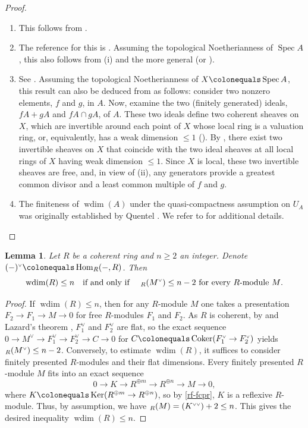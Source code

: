 \documentclass[JEP,XML,SOM,Unicode,published]{cedram}
\newenvironment{enumeratei}
{\bgroup\def\theenumi{\roman{enumi}}\def\theenumii{\arabic{enumii}}\begin{enumerate}}
{\end{enumerate}\egroup}
\newcommand{\NoChangel}[1]{%
\expandafter\let\csname old\string#1\endcsname=#1
\let#1=\relax
\newcommand{#1}{\mathop{\mathcode`l="716C\csname old\string#1\endcsname\mathcode`l="7160}\nolimits}%
}
\let\oldvee\vee
\renewcommand{\vee}{{\scriptscriptstyle\oldvee}}
\let\ce\colonequals
\let\x\text
\let\q\quad
\DeclareMathOperator{\fldim}{fl.dim}\NoChangel{\fldim}
\newcommand{\ddual}{\vee\vee}
\DeclareMathOperator{\Ker}{Ker}
\DeclareMathOperator{\Coker}{Coker}
\DeclareMathOperator{\Spec}{Spec}
\DeclareMathOperator{\wdim}{wdim}
\DeclareMathOperator{\Hom}{Hom}
\newcommand{\bpf}{\begin{proof}}
\newcommand{\epf}{\end{proof}}
\newcommand{\blem}{\begin{lemma}}
\newcommand{\elem}{\end{lemma}}
\newcommand{\benumr}{\begin{enumeratei}}
\newcommand{\eenumr}{\end{enumeratei}}
\providecommand{\SP}[1]{\cite[\href{https://stacks.math.columbia.edu/tag/#1}{#1}]{SP}}
\theoremstyle{plain}
\newtheorem{lemma}[subsection]{Lemma}
\theoremstyle{definition}
\begin{document}
\skpt
\bpf
\benumr
\item This follows from \cite[Cor.\,4.3]{Ber72}.

\item The reference for this is \cite[Prop.\,2.4]{Que71}. Assuming the topological Noetherianness of $\Spec A$, this also follows from (i) and the more general  (or ).

\item See \cite[Prop.\,3.2]{Que71}. Assuming the topological Noetherianness of $X\ce\Spec A$, this result can also be deduced from  as follows: consider two nonzero elements, $f$ and $g$, in $A$.
Now, examine the two (finitely generated) ideals, $fA+gA$ and $fA\cap gA$, of $A$. These two ideals define two coherent sheaves on $X$, which are invertible around each point of $X$ whose local ring is a valuation ring, or, equivalently, has a weak dimension $\le 1$ (\SP{092S}). By , there exist two invertible sheaves on $X$ that coincide with the two ideal sheaves at all local rings of $X$ having weak dimension $\le 1$. Since $X$ is local, these two invertible sheaves are free, and, in view of (ii), any generators provide a greatest common divisor and a least common multiple of $f$ and $g$.

\item The finiteness of $\wdim(A)$ under the quasi-compactness assumption on $U_A$ was originally established by Quentel \cite[Cor.\,1.1]{Que71}. We refer to  for additional details. \qedhere
\eenumr
\epf
\blem\label{wdim-2}
Let $R$ be a coherent ring and $n\geq 2$ an integer.
Denote $(-)^{\vee}\ce \Hom_R(-,R)$.
Then
\[
\x{$\wdim(R)\leq n$\q if and only if \q $\fldim_R(M^{\vee})\leq n-2$ for every $R$\nobreakdash-mod\-ule $M$.}
\]
\elem
\bpf
If $\wdim(R)\leq n$, then for any $R$\nobreakdash-mod\-ule $M$ one takes a presentation $F_2\to F_1\to M\to 0$ for free $R$\nobreakdash-mod\-ules $F_1$ and $F_2$.
As $R$ is coherent, by \SP{05CZ} and Lazard's theorem \SP{058G}, $F_1^{\vee}$ and $F_2^{\vee}$ are flat, so the exact sequence $0\to M^{\vee}\to F_1^{\vee}\to F_2^{\vee}\to C\to 0$ for $C\ce \Coker(F_1^{\vee}\to F_2^{\vee})$ yields $\fldim_R(M^{\vee})\leq n-2$.
Conversely, to estimate $\wdim(R)$, it suffices to consider finitely presented $R$\nobreakdash-mod\-ules and their flat dimensions.
Every finitely presented $R$\nobreakdash-mod\-ule $M$ fits into an exact sequence
\[
0\to K\to R^{\oplus m}\to R^{\oplus n}\to M\to 0,
\]
where $K\ce \Ker(R^{\oplus m}\to R^{\oplus n})$, so by \eqref{rf-fcpr}, $K$ is a reflexive $R$\nobreakdash-mod\-ule.
Thus, by assumption, we have $\fldim_R(M)=\fldim(K^{\ddual})+2\leq n$.
This gives the desired inequality $\wdim(R)\leq n$.
\epf
\end{document}
